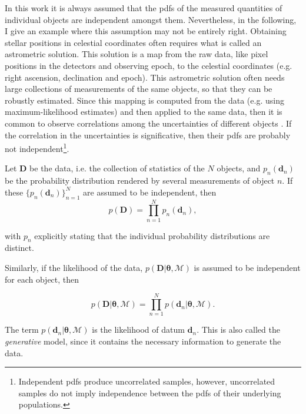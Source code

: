 In this work it is always assumed that the \glspl{pdf}  of the measured quantities of individual objects are independent amongst them. Nevertheless, in the following, I give an example where this assumption may not be entirely right. Obtaining stellar positions in celestial coordinates often requires what is called an astrometric solution. This solution is a map from the raw data, like pixel positions in the detectors and observing epoch, to the celestial coordinates (e.g. right ascension, declination and epoch). This astrometric solution often needs large collections of measurements of the same objects, so that they can be robustly estimated. Since this mapping is computed from the data (e.g. using maximum-likelihood estimates) and then applied to the same data, then it is common to observe correlations among the uncertainties of different objects \cite[see for example][]{2010IAUS..261..320H,2017A&A...601A..19G}. If the correlation in the uncertainties is significative, then their \glspl{pdf}  are probably not independent\footnote{Independent \glspl{pdf}  produce uncorrelated samples, however, uncorrelated samples do not imply independence between the \glspl{pdf}  of their underlying populations.}.  


Let $\mathbf{D}$ be the data, i.e. the collection of statistics of the $N$ objects, and $p_n(\mathbf{d}_n)$ be the probability distribution rendered by several measurements of object $n$. If these $\{p_n(\mathbf{d}_n)\}_{n=1}^N$ are assumed to be independent, then
\begin{equation}
\label{eq:independence}
 p(\mathbf{D}) = \prod_{n=1}^N p_n(\mathbf{d}_n),
\end{equation}

 with $p_n$ explicitly stating that the individual probability distributions are distinct. 
 
Similarly, if the likelihood of the data, $p(\mathbf{D}|\boldsymbol{\theta},\mathcal{M})$ is assumed to be independent for each object, then

\begin{equation}
\label{eq:lik_datum}
 p(\mathbf{D}|\boldsymbol{\theta},\mathcal{M}) = \prod_{n=1}^N p(\mathbf{d}_n|\boldsymbol{\theta},\mathcal{M}).
\end{equation}

The term $p(\mathbf{d}_n|\boldsymbol{\theta},\mathcal{M})$ is the likelihood of datum $\mathbf{d}_n$. This is also called the \emph{generative} model, since it contains the necessary information to generate the data. 


